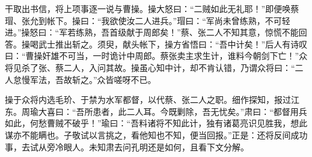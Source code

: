 干取出书信，将上项事逐一说与曹操。操大怒曰：“二贼如此无礼耶！”即便唤蔡瑁、张允到帐下。操曰：“我欲使汝二人进兵。”瑁曰：“军尚未曾练熟，不可轻进。”操怒曰：“军若练熟，吾首级献于周郎矣！”蔡、张二人不知其意，惊慌不能回答。操喝武士推出斩之。须臾，献头帐下，操方省悟曰：“吾中计矣！”后人有诗叹曰：“曹操奸雄不可当，一时诡计中周郎。蔡张卖主求生计，谁料今朝剑下亡！”众将见杀了张、蔡二人，入问其故。操虽心知中计，却不肯认错，乃谓众将曰：“二人怠慢军法，吾故斩之。”众皆嗟呀不已。

操于众将内选毛玠、于禁为水军都督，以代蔡、张二人之职。细作探知，报过江东。周瑜大喜曰：“吾所患者，此二人耳。今既剿除，吾无忧矣。”肃曰：“都督用兵如此，何愁曹贼不破乎！”瑜曰：“吾料诸将不知此计，独有诸葛亮识见胜我，想此谋亦不能瞒也。子敬试以言挑之，看他知也不知，便当回报。”正是：还将反间成功事，去试从旁冷眼人。未知肃去问孔明还是如何，且看下文分解。